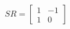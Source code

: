 \documentclass[preview]{standalone}
\begin{document}
\begin{align*}
SR=\begin{bmatrix}1&-1\\1&0\end{bmatrix}
\end{align*}
\end{document}
